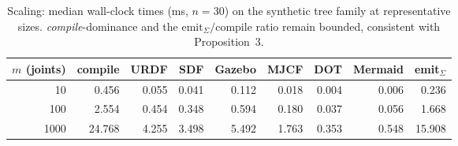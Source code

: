 \begin{table}[t]
\centering
\caption{Scaling: median wall-clock times (ms, $n{=}30$) on the synthetic \textsf{tree} family at representative sizes. \textit{compile}-dominance and the $\mathrm{emit}_\Sigma / \mathrm{compile}$ ratio remain bounded, consistent with Proposition~3.}
\label{tab:scaling}
\begin{tabular}{rrrrrrrrr}
\toprule
$m$ (joints) & compile & URDF & SDF & Gazebo & MJCF & DOT & Mermaid & emit$_\Sigma$ \\
\midrule
10 & 0.456 & 0.055 & 0.041 & 0.112 & 0.018 & 0.004 & 0.006 & 0.236 \\
100 & 2.554 & 0.454 & 0.348 & 0.594 & 0.180 & 0.037 & 0.056 & 1.668 \\
1000 & 24.768 & 4.255 & 3.498 & 5.492 & 1.763 & 0.353 & 0.548 & 15.908 \\
\bottomrule
\end{tabular}
\end{table}